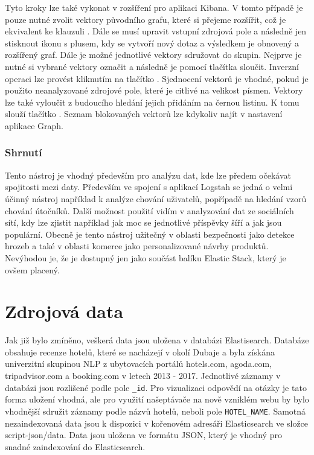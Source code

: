 \documentclass[czech,BP]{thesiskiv}
\begin{document}
Tyto kroky lze také vykonat v rozšíření pro aplikaci Kibana. V tomto případě je pouze nutné zvolit vektory původního grafu, které si přejeme rozšířit, což je ekvivalent ke klauzuli . Dále se musí upravit vstupní zdrojová pole a následně jen stisknout ikonu s plusem, kdy se vytvoří nový dotaz a výsledkem je obnovený a rozšířený graf. Dále je možné jednotlivé vektory sdružovat do skupin. Nejprve je nutné si vybrané vektory označit a následně je pomocí tlačítka  sloučit. Inverzní operaci lze provést kliknutím na tlačítko . Sjednocení vektorů je vhodné, pokud je použito neanalyzované zdrojové pole, které je citlivé na velikost písmen. Vektory lze také vyloučit z budoucího hledání jejich přidáním na černou listinu. K tomu slouží tlačítko . Seznam blokovaných vektorů lze kdykoliv najít v nastavení aplikace Graph.

\subsection{Shrnutí}
Tento nástroj je vhodný především pro analýzu dat, kde lze předem očekávat spojitosti mezi daty. Především ve spojení s aplikací Logstah se jedná o velmi účinný nástroj například k analýze chování uživatelů, popřípadě na hledání vzorů chování útočníků. Další možnost použití vidím v analyzování dat ze sociálních sítí, kdy lze zjistit například jak moc se jednotlivé příspěvky šíří a jak jsou populární. Obecně je tento nástroj užitečný v oblasti bezpečnosti jako detekce hrozeb a také v oblasti komerce jako personalizované návrhy produktů. Nevýhodou je, že je dostupný jen jako součást balíku Elastic Stack, který je ovšem placený.

\chapter{Zdrojová data}
Jak již bylo zmíněno, veškerá data jsou uložena v databázi Elastisearch. Databáze obsahuje recenze hotelů, které se nacházejí v okolí Dubaje a byla získána univerzitní skupinou NLP z ubytovacích portálů hotels.com, ago\-da.com, tripadvisor.com a booking.com v letech 2013 - 2017. Jednotlivé záznamy v databázi jsou rozlišené podle pole \texttt{\_id}. Pro vizualizaci odpovědí na otázky je tato forma uložení vhodná, ale pro využití našeptávače na nově vzniklém  webu by bylo vhodnější sdružit záznamy podle názvů hotelů, neboli pole \texttt{HOTEL\_NAME}. Samotná nezaindexovaná data jsou k dispozici v kořenovém adresáři Elasticsearch ve složce script-json/data. Data jsou uložena ve formátu JSON, který je vhodný pro snadné zaindexování do Elasticsearch.
\end{document}
